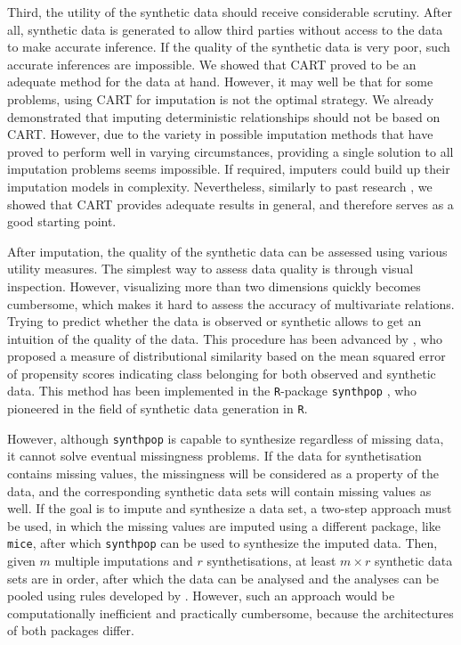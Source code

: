 \documentclass[psych,article,submit,moreauthors,pdftex]{mdpi}
\begin{document}
Third, the utility of the synthetic data should receive considerable
scrutiny. After all, synthetic data is generated to allow third parties
without access to the data to make accurate inference. If the quality of
the synthetic data is very poor, such accurate inferences are
impossible. We showed that CART proved to be an adequate method for the
data at hand. However, it may well be that for some problems, using CART
for imputation is not the optimal strategy. We already demonstrated that
imputing deterministic relationships should not be based on CART.
However, due to the variety in possible imputation methods that have
proved to perform well in varying circumstances, providing a single
solution to all imputation problems seems impossible. If required,
imputers could build up their imputation models in complexity.
Nevertheless, similarly to past research
\citep[e.g.,][]{burgette_reiter_cart_2010, doove_buuren_recursive_2014, raab_practical_2016},
we showed that CART provides adequate results in general, and therefore
serves as a good starting point.

After imputation, the quality of the synthetic data can be assessed
using various utility measures. The simplest way to assess data quality
is through visual inspection. However, visualizing more than two
dimensions quickly becomes cumbersome, which makes it hard to assess the
accuracy of multivariate relations. Trying to predict whether the data
is observed or synthetic allows to get an intuition of the quality of
the data. This procedure has been advanced by \citet{snoke2018general},
who proposed a measure of distributional similarity based on the mean
squared error of propensity scores indicating class belonging for both
observed and synthetic data. This method has been implemented in the
\texttt{R}-package \texttt{synthpop} \citep{synthpop}, who pioneered in
the field of synthetic data generation in \texttt{R}.

However, although \texttt{synthpop} is capable to synthesize regardless
of missing data, it cannot solve eventual missingness problems. If the
data for synthetisation contains missing values, the missingness will be
considered as a property of the data, and the corresponding synthetic
data sets will contain missing values as well. If the goal is to impute
and synthesize a data set, a two-step approach must be used, in which
the missing values are imputed using a different package, like
\texttt{mice}, after which \texttt{synthpop} can be used to synthesize
the imputed data. Then, given \(m\) multiple imputations and \(r\)
synthetisations, at least \(m \times r\) synthetic data sets are in
order, after which the data can be analysed and the analyses can be
pooled using rules developed by \citet{reiter2004simultaneous}. However,
such an approach would be computationally inefficient and practically
cumbersome, because the architectures of both packages differ.
\end{document}
